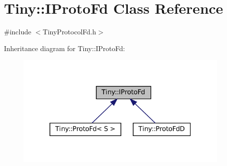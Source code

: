 \hypertarget{classTiny_1_1IProtoFd}{}\section{Tiny\+:\+:I\+Proto\+Fd Class Reference}
\label{classTiny_1_1IProtoFd}


{\ttfamily \#include $<$Tiny\+Protocol\+Fd.\+h$>$}



Inheritance diagram for Tiny\+:\+:I\+Proto\+Fd\+:\nopagebreak
\begin{figure}[H]
\begin{center}
\leavevmode
\includegraphics[width=294pt]{classTiny_1_1IProtoFd__inherit__graph}
\end{center}
\end{figure}
